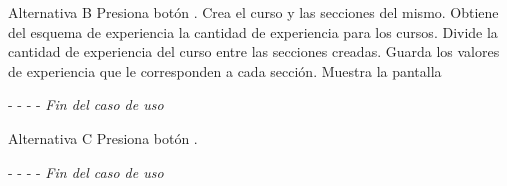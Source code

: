 \begin{UCtrayectoria}{Alternativa B}
    \actor Presiona botón .
    \sistema Crea el curso y las secciones del mismo.
    \sistema Obtiene del esquema de experiencia la cantidad de experiencia para los cursos.
    \sistema Divide la cantidad de experiencia del curso entre las secciones creadas.
    \sistema Guarda los valores de experiencia que le corresponden a cada sección.
    \sistema Muestra la pantalla 
    \item[- -] - - {\em Fin del caso de uso}
\end{UCtrayectoria}

\begin{UCtrayectoria}[Cancelar]{Alternativa C}
    \actor Presiona botón .
    \item[- -] - - {\em Fin del caso de uso}
\end{UCtrayectoria}


\clearpage
